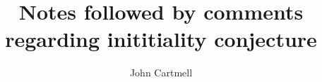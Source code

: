 \documentclass[10pt,a4paper]{article}
\theoremstyle{remark}
\begin{document}
\title{Notes followed by comments regarding inititiality conjecture}

\author{John Cartmell}

\maketitle

\newcommand{\gatU}{\gat[U]}
\newcommand{\gatUw}{\gatU\ }
\newcommand{\CofU}{\ccat[C](\gat[U])}
\newcommand{\KU}{K_{\gat[U]}}
\newcommand{\KUp}{K_{\gat[U']}}
\newcommand{\catCon}{\cat{Con}}
\newcommand{\catGAT}{\cat{GAT}}

\newcommand{\gatrule}[2]{$#1 \tstyle #2$}

\newcommand{\inlinedisplay}[1]
{
\setlength{\fboxsep}{1.5pt}
\setlength{\fboxrule}{0pt}
\fbox{$\displaystyle #1$}
}

\newcommand{\gatdisplayrule}[2]
{
\setlength{\fboxsep}{1pt}
\setlength{\fboxrule}{0pt}
\fbox{$\displaystyle \frac{#1}{#2}$}
}
\newcommand{\Isort}{I_{sort}}
\newcommand{\Iop}{I_{op}}
\newcommand {\Ihat}{\hat{I}}

\renewcommand{\crossx}[3]{#1 \underset{\tiny #3}{\cross} #2}
\newcommand{\fonestar}   {{f_1}\kern-.15em^*}
\newcommand{\ftwostar}   {{f_2}\kern-.15em^*}
\newcommand{\fjstar}     {{f_j}\kern-.2em^*}
\newcommand{\fjpstar}    {{f_{j-1}}\kern-.25em^*}
\newcommand{\smstar}{{s_m}\kern-.25em^*}
\newcommand{\sonestar}{{s_1}\kern-.15em^*}

\newcommand{\Trule} {T-rule\ }
\newcommand{\trule} {$\in$-rule\ }
\newcommand{\Teqrule} {T=-rule\ }
\newcommand{\teqrule} {$\in=$-rule\ }

\newcommand{\genericAintroductoryrule} {\gatdisplayrule{\xDelta{n}}{\isT{A(\xn}}}
\newcommand{\genericfintroductoryrule}  {\gatdisplayrule{\xDelta{n}}{\ofT{f(\xn)}{\Delta}}}

\newcommand{\Imapsto}{\scaleto{\mapsto}{10pt}}

\newcommand{\MAPTO}{&
\refstepcounter{equation}(\theequation) &&
$\mapsto$ &&}


\newcommand{\gatinterpretationdetail}[5]{
\refstepcounter{equation}(\theequation)\label{#1}& \gatrule{#2}{#3}&$\mapsto$&&$#4$&#5}

\newcommand{\gatinterpretationintro}[5]{
\refstepcounter{equation}(\theequation)\label{#1}& \gatrule{#2}{#3}&$\mapsto$&&\cellcolor{lightergrey}$#4$&#5}
\end{document}
